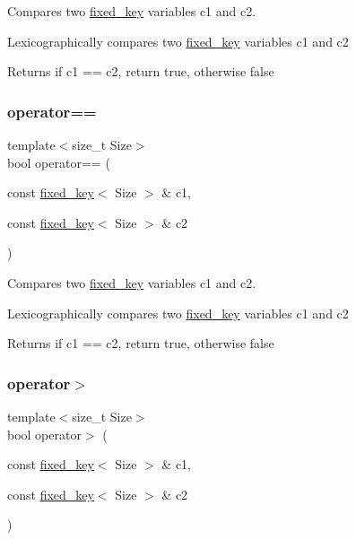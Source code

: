 Compares two \mbox{\hyperlink{classaacio_1_1fixed__key}{fixed\+\_\+key}} variables c1 and c2. 

Lexicographically compares two \mbox{\hyperlink{classaacio_1_1fixed__key}{fixed\+\_\+key}} variables c1 and c2 \begin{DoxyReturn}{Returns}
if c1 == c2, return true, otherwise false 
\end{DoxyReturn}
\mbox{\label{classaacio_1_1fixed__key_a30f70a7e52cc0469c1e48d261fec6f48}} 
\subsubsection{\texorpdfstring{operator==}{operator==}\hspace{0.1cm}{\footnotesize\ttfamily [2/2]}}
{\footnotesize\ttfamily template$<$size\+\_\+t Size$>$ \\
bool operator== (\begin{DoxyParamCaption}\item[{const \mbox{\hyperlink{classaacio_1_1fixed__key}{fixed\+\_\+key}}$<$ Size $>$ \&}]{c1,  }\item[{const \mbox{\hyperlink{classaacio_1_1fixed__key}{fixed\+\_\+key}}$<$ Size $>$ \&}]{c2 }\end{DoxyParamCaption})\hspace{0.3cm}{\ttfamily [friend]}}



Compares two \mbox{\hyperlink{classaacio_1_1fixed__key}{fixed\+\_\+key}} variables c1 and c2. 

Lexicographically compares two \mbox{\hyperlink{classaacio_1_1fixed__key}{fixed\+\_\+key}} variables c1 and c2 \begin{DoxyReturn}{Returns}
if c1 == c2, return true, otherwise false 
\end{DoxyReturn}
\mbox{\label{classaacio_1_1fixed__key_a0d80d7fcf875276760867c2be8b66438}} 
\subsubsection{\texorpdfstring{operator$>$}{operator>}\hspace{0.1cm}{\footnotesize\ttfamily [1/2]}}
{\footnotesize\ttfamily template$<$size\+\_\+t Size$>$ \\
bool operator$>$ (\begin{DoxyParamCaption}\item[{const \mbox{\hyperlink{classaacio_1_1fixed__key}{fixed\+\_\+key}}$<$ Size $>$ \&}]{c1,  }\item[{const \mbox{\hyperlink{classaacio_1_1fixed__key}{fixed\+\_\+key}}$<$ Size $>$ \&}]{c2 }\end{DoxyParamCaption})\hspace{0.3cm}{\ttfamily [friend]}}



